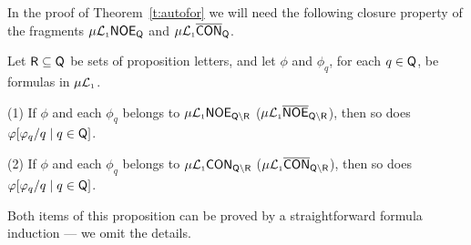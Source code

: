 In the proof of Theorem~\ref{t:autofor} we will need the following closure 
property of the fragments $\mu\mathcal{L}_{\scriptscriptstyle 1}\mathsf{NOE}_{\mathsf{Q}}$ and 
$\mu\mathcal{L}_{\scriptscriptstyle 1}\overline{\mathsf{CON}}_{\mathsf{Q}}$.

\begin{proposition}
\label{p:comp}
Let $\mathsf{R} \subseteq \mathsf{Q}$ be sets of proposition letters, and let $\phi$ 
and $\phi_{q}$, for each $q \in \mathsf{Q}$, be formulas in $\mu\mathcal{L}_{\scriptscriptstyle 1}$.

(1) If $\phi$ and each $\phi_{q}$ belongs to 
    $\mu\mathcal{L}_{\scriptscriptstyle 1}\mathsf{NOE}_{\mathsf{Q}\setminus\mathsf{R}}$ 
    ($\mu\mathcal{L}_{\scriptscriptstyle 1}\overline{\mathsf{NOE}}_{\mathsf{Q}\setminus\mathsf{R}}$), 
   then so does $\varphi[\varphi_{q}/q \mid q \in \mathsf{Q}]$.

(2) If $\phi$ and each $\phi_{q}$ belongs to
   $\mu\mathcal{L}_{\scriptscriptstyle 1}\mathsf{CON}_{\mathsf{Q}\setminus\mathsf{R}}$
   ($\mu\mathcal{L}_{\scriptscriptstyle 1}\overline{\mathsf{CON}}_{\mathsf{Q}\setminus\mathsf{R}}$), 
   then so does $\varphi[\varphi_{q}/q \mid q \in \mathsf{Q}]$.
\end{proposition}

Both items of this proposition can be proved by a straightforward formula 
induction --- we omit the details.


